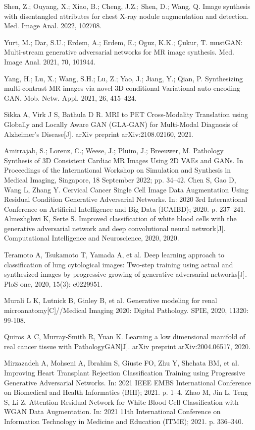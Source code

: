 \documentclass[preprint,12pt,authoryear]{elsarticle}
\begin{document}
\begin{thebibliography}{00}
Shen, Z.; Ouyang, X.; Xiao, B.; Cheng, J.Z.; Shen, D.; Wang, Q. Image synthesis with disentangled attributes for chest X-ray nodule augmentation and detection. Med. Image Anal. 2022, 102708.

Yurt, M.; Dar, S.U.; Erdem, A.; Erdem, E.; Oguz, K.K.; Çukur, T. mustGAN: Multi-stream generative adversarial networks for MR image synthesis. Med. Image Anal. 2021, 70, 101944.

Yang, H.; Lu, X.; Wang, S.H.; Lu, Z.; Yao, J.; Jiang, Y.; Qian, P. Synthesizing multi-contrast MR images via novel 3D conditional Variational auto-encoding GAN. Mob. Netw. Appl. 2021, 26, 415–424.

Sikka A, Virk J S, Bathula D R. MRI to PET Cross-Modality Translation using Globally and Locally Aware GAN (GLA-GAN) for Multi-Modal Diagnosis of Alzheimer's Disease[J]. arXiv preprint arXiv:2108.02160, 2021.

Amirrajab, S.; Lorenz, C.; Weese, J.; Pluim, J.; Breeuwer, M. Pathology Synthesis of 3D Consistent Cardiac MR Images Using 2D VAEs and GANs. In Proceedings of the International Workshop on Simulation and Synthesis in Medical Imaging, Singapore, 18 September 2022; pp. 34–42.
Chen S, Gao D, Wang L, Zhang Y. Cervical Cancer Single Cell Image Data Augmentation Using Residual Condition Generative Adversarial Networks. In: 2020 3rd International Conference on Artificial Intelligence and Big Data (ICAIBD); 2020. p. 237–241.
Almezhghwi K, Serte S. Improved classification of white blood cells with the generative adversarial network and deep convolutional neural network[J]. Computational Intelligence and Neuroscience, 2020, 2020.

 Teramoto A, Tsukamoto T, Yamada A, et al. Deep learning approach to classification of lung cytological images: Two-step training using actual and synthesized images by progressive growing of generative adversarial networks[J]. PloS one, 2020, 15(3): e0229951.

 Murali L K, Lutnick B, Ginley B, et al. Generative modeling for renal microanatomy[C]//Medical Imaging 2020: Digital Pathology. SPIE, 2020, 11320: 99-108.

 Quiros A C, Murray-Smith R, Yuan K. Learning a low dimensional manifold of real cancer tissue with PathologyGAN[J]. arXiv preprint arXiv:2004.06517, 2020.

  Mirzazadeh A, Mohseni A, Ibrahim S, Giuste FO, Zhu Y, Shehata BM, et al. Improving Heart Transplant Rejection Classification Training using Progressive Generative Adversarial Networks. In: 2021 IEEE EMBS International Conference on Biomedical and Health Informatics (BHI); 2021. p. 1–4.
 Zhao M, Jin L, Teng S, Li Z. Attention Residual Network for White Blood Cell Classification with WGAN Data Augmentation. In: 2021 11th International Conference on Information Technology in Medicine and Education (ITME); 2021. p. 336–340.


\end{thebibliography}
\end{document}
